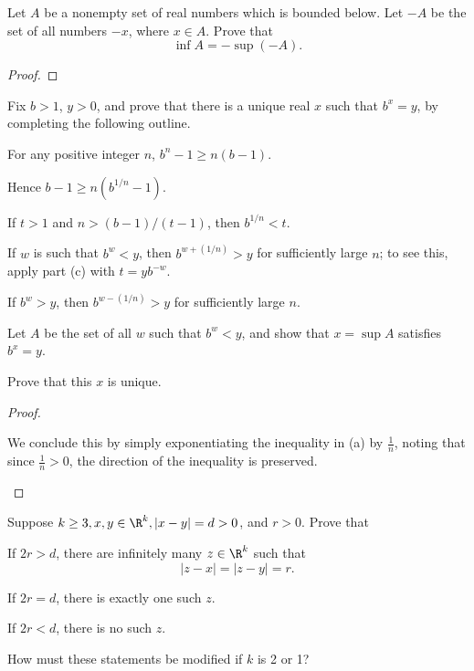 \documentclass{assignment}
\begin{document}
\begin{question}[5]
  Let $A$ be a nonempty set of real numbers which is bounded below. Let $-A$ be the set of all numbers
  $-x$, where $x\in A$. Prove that $$\inf A = -\sup(-A).$$
\end{question}
\begin{proof}
\end{proof}

\begin{question}[7]
  Fix $b > 1$, $y > 0$, and prove that there is a unique real $x$ such that $b^x = y$, by completing
  the following outline.
  \begin{qparts}
    \item For any positive integer $n$, $b^n - 1 \geq n(b-1)$.
    \item Hence $b - 1 \geq n(b^{1/n} - 1)$. 
    \item If $t > 1$ and $n > (b-1)/(t-1)$, then $b^{1/n} < t$.
    \item If $w$ is such that $b^w < y$, then $b^{w + (1/n)} > y$ for sufficiently large $n$; to see this,
      apply part (c) with $t = yb^{-w}$. 
    \item If $b^w > y$, then $b^{w - (1/n)} > y$ for sufficiently large $n$.
    \item Let $A$ be the set of all $w$ such that $b^w < y$, and show that $x = \sup A$ satisfies $b^x 
      = y$. 
    \item Prove that this $x$ is unique.
  \end{qparts}
\end{question}
\begin{proof}
  \begin{qparts}
  \item We conclude this by simply exponentiating the inequality in (a) by $\frac{1}{n}$, noting that
    since $\frac{1}{n} > 0$, the direction of the inequality is preserved.
  \item 
  \end{qparts}
\end{proof}

\begin{question}[16]
  Suppose $k\geq 3, x,y\in\R^k, |x - y| = d > 0$, and $r > 0$. Prove that 
  \begin{qparts}
    \item If $2r > d$, there are infinitely many $z\in\R^k$ such that $$|z-x| = |z - y| = r.$$
    \item If $2r = d$, there is exactly one such $z$.
    \item If $2r < d$, there is no such $z$.
  \end{qparts}
  How must these statements be modified if $k$ is 2 or 1?
\end{question}
\end{document}
